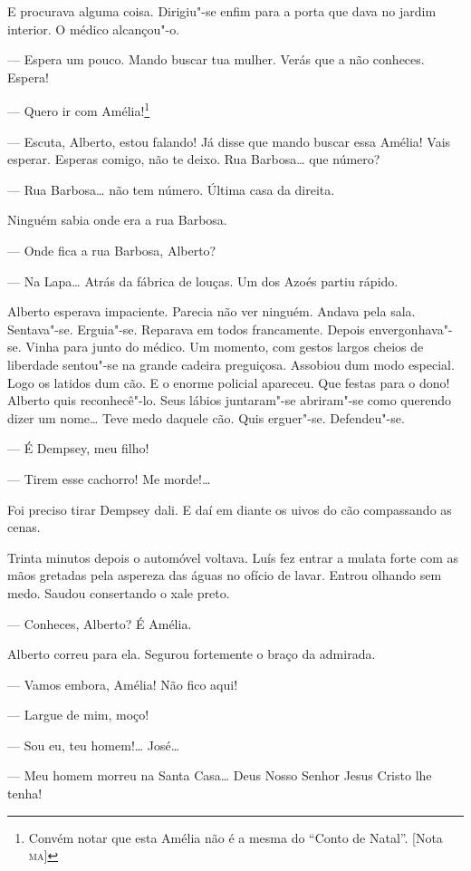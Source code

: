 \begin{linenumbers}
E procurava alguma coisa. Dirigiu"-se enfim para a porta que dava no
jardim interior. O médico alcançou"-o.

--- Espera um pouco. Mando buscar tua mulher. Verás que a não conheces.
Espera!

--- Quero ir com Amélia!\footnote{Convém notar que esta Amélia não é a
  mesma do ``Conto de Natal''. {[}Nota \textsc{ma}{]}}

--- Escuta, Alberto, estou falando! Já disse que mando buscar essa
Amélia! Vais esperar. Esperas comigo, não te deixo. Rua Barbosa\ldots{} que
número?

--- Rua Barbosa\ldots{} não tem número. Última casa da direita.

Ninguém sabia onde era a rua Barbosa.

--- Onde fica a rua Barbosa, Alberto?

--- Na Lapa\ldots{} Atrás da fábrica de louças. Um dos Azoés partiu rápido.

Alberto esperava impaciente. Parecia não ver ninguém. Andava pela sala.
Sentava"-se. Erguia"-se. Reparava em todos francamente. Depois
envergonhava"-se. Vinha para junto do médico. Um momento, com gestos
largos cheios de liberdade sentou"-se na grande cadeira preguiçosa.
Assobiou dum modo especial. Logo os latidos dum cão. E o enorme policial
apareceu. Que festas para o dono! Alberto quis reconhecê"-lo. Seus lábios
juntaram"-se abriram"-se como querendo dizer um nome\ldots{} Teve medo daquele
cão. Quis erguer"-se. Defendeu"-se.

--- É Dempsey, meu filho!

--- Tirem esse cachorro! Me morde!\ldots{}

Foi preciso tirar Dempsey dali. E daí em diante os uivos do cão
compassando as cenas.

Trinta minutos depois o automóvel voltava. Luís fez entrar a mulata
forte com as mãos gretadas pela aspereza das águas no ofício de lavar.
Entrou olhando sem medo. Saudou consertando o xale preto.

--- Conheces, Alberto? É Amélia.

Alberto correu para ela. Segurou fortemente o braço da admirada.

--- Vamos embora, Amélia! Não fico aqui!

--- Largue de mim, moço!

--- Sou eu, teu homem!\ldots{} José\ldots{}

--- Meu homem morreu na Santa Casa\ldots{} Deus Nosso Senhor Jesus Cristo lhe
tenha!


\end{linenumbers}
